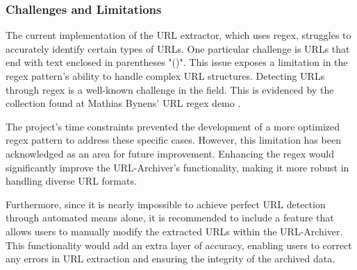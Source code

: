 \subsubsection{Challenges and Limitations}
The current implementation of the URL extractor, which uses regex, struggles to accurately identify certain types of URLs. One particular challenge is URLs that end with text enclosed in parentheses "()". This issue exposes a limitation in the regex pattern's ability to handle complex URL structures. Detecting URLs through regex is a well-known challenge in the field. This is evidenced by the collection found at Mathias Bynens' URL regex demo \cite{bynens2024urlregex}.

The project's time constraints prevented the development of a more optimized regex pattern to address these specific cases. However, this limitation has been acknowledged as an area for future improvement. Enhancing the regex would significantly improve the URL-Archiver's functionality, making it more robust in handling diverse URL formats.

Furthermore, since it is nearly impossible to achieve perfect URL detection through automated means alone, it is recommended to include a feature that allows users to manually modify the extracted URLs within the URL-Archiver. This functionality would add an extra layer of accuracy, enabling users to correct any errors in URL extraction and ensuring the integrity of the archived data.


